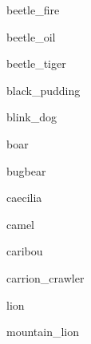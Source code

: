 \documentclass[letterpaper,serif]{module}
\begin{document}
\begin{newmonster}{beetle_fire}\end{newmonster}

\begin{newmonster}{beetle_oil}\end{newmonster}

\begin{newmonster}{beetle_tiger}\end{newmonster}

\begin{newmonster}{black_pudding}\end{newmonster}

\begin{newmonster}{blink_dog}\end{newmonster}

\begin{newmonster}{boar}\end{newmonster}

\begin{newmonster}{bugbear}\end{newmonster}

\begin{newmonster}{caecilia}\end{newmonster}

\begin{newmonster}{camel}\end{newmonster}

\begin{newmonster}{caribou}\end{newmonster}

\begin{newmonster}{carrion_crawler}\end{newmonster}

\begin{newmonster}{lion}\end{newmonster}

\begin{newmonster}{mountain_lion}\end{newmonster}
\end{document}

